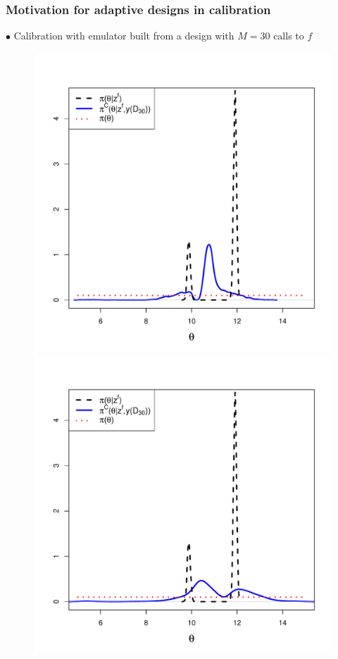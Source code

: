 \documentclass[nopagenumber,9pt]{beamer}
\begin{document}
 \begin{frame}
 \frametitle{Motivation for adaptive designs in calibration}
 
$\bullet$ Calibration with emulator built from a design with $M=30$ calls to $f$

  \begin{center}
  \begin{figure}
   \includegraphics[scale=0.25]{calib_sans_biais_jouet_M30_072.pdf}
   \includegraphics[scale=0.25]{calib_sans_biais_jouet_M30_062.pdf}
  \end{figure}
 
  \end{center}

  

 
\end{frame}
\end{document}
